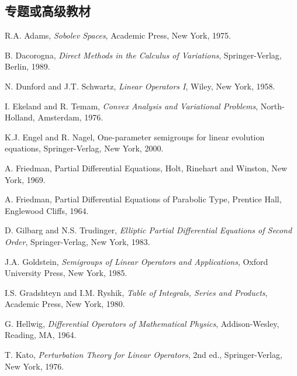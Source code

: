 \subsection{专题或高级教材}\label{sec:references-specialized-advanced-texts}

\begin{list}{}{\setlength{\labelwidth}{3em}\setlength{\leftmargin}{4em}\setlength{\labelsep}{.8em}}
\item[{[Adam]}] R.A. Adams, \emph{Sobolev Spaces}, Academic Press, New York, 1975.

\item[{[Dac]}] B. Dacorogna, \emph{Direct Methods in the Calculus of Variations}, Springer-Verlag, Berlin, 1989.

\item[{[DS]}] N. Dunford and J.T. Schwartz, \emph{Linear Operators I}, Wiley, New York, 1958.

\item[{[ET]}] I. Ekeland and R. Temam, \emph{Convex Analysis and Variational Problems}, North-Holland, Amsterdam, 1976.

\item[{[EN]}] K.J. Engel and R. Nagel, One-parameter semigroups for linear evolution equations, Springer-Verlag, New York, 2000.

\item[{[Fri1]}] A. Friedman, Partial Differential Equations, Holt, Rinehart and Winston, New York, 1969.

\item[{[Fri2]}] A. Friedman, Partial Differential Equations of Parabolic Type, Prentice Hall, Englewood Cliffs, 1964.

\item[{[GT]}] D. Gilbarg and N.S. Trudinger, \emph{Elliptic Partial Differential Equations of Second Order}, Springer-Verlag, New York, 1983.

\item[{[Go]}] J.A. Goldstein, \emph{Semigroups of Linear Operators and Applications}, Oxford University Press, New York, 1985.

\item[{[GR]}] I.S. Gradshteyn and I.M. Ryshik, \emph{Table of Integrals, Series and Products}, Academic Press, New York, 1980.

\item[{[He]}] G. Hellwig, \emph{Differential Operators of Mathematical Physics}, Addison-Wesley, Reading, MA, 1964.

\item[{[Ka]}] T. Kato, \emph{Perturbation Theory for Linear Operators}, 2nd ed., Springer-Verlag, New York, 1976.


\end{list}
